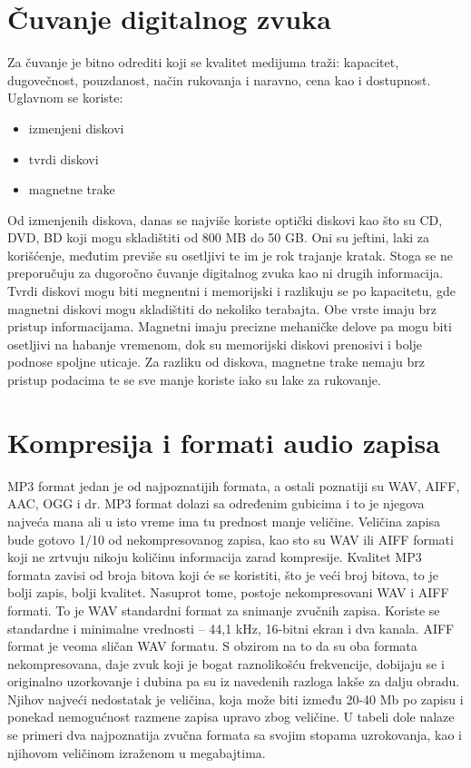 \documentclass[a4paper]{article}
\begin{document}
    \section{Čuvanje digitalnog zvuka}
    Za čuvanje je bitno odrediti koji se kvalitet medijuma traži: kapacitet, dugovečnost, pouzdanost, način rukovanja i naravno, cena kao i dostupnost. Uglavnom se koriste:
    \begin{itemize}
        \item izmenjeni diskovi
        \item tvrdi diskovi
        \item magnetne trake
    \end{itemize}
Od izmenjenih diskova, danas se najviše koriste optički diskovi kao što su CD, DVD, BD koji mogu skladištiti od 800 MB do 50 GB. Oni su jeftini, laki za korišćenje, međutim previše su osetljivi te im je rok trajanje kratak. Stoga se ne preporučuju za dugoročno čuvanje digitalnog zvuka kao ni drugih informacija. 
Tvrdi diskovi mogu biti megnentni i memorijski i razlikuju se po kapacitetu, gde magnetni diskovi mogu skladištiti do nekoliko terabajta. Obe vrste imaju brz pristup informacijama. Magnetni imaju precizne mehaničke delove pa mogu biti osetljivi na habanje vremenom, dok su memorijski diskovi prenosivi i bolje podnose spoljne uticaje. 
Za razliku od diskova, magnetne trake nemaju brz pristup podacima te se sve manje koriste iako su lake za rukovanje.\cite{jurkovic2021digitalizacija} 

        \section{Kompresija i formati audio zapisa}
    MP3 format jedan je od najpoznatijih formata, a ostali poznatiji su WAV, AIFF, AAC,
    OGG i dr. MP3 format dolazi sa određenim gubicima i to je njegova najveća mana ali u isto vreme ima tu prednost manje veličine. Veličina zapisa bude gotovo 1/10 od nekompresovanog zapisa, kao sto su WAV ili AIFF formati koji ne zrtvuju nikoju količinu informacija zarad kompresije. Kvalitet
    MP3 formata zavisi od broja bitova koji će se koristiti, što je veći broj bitova, to je bolji zapis,
    bolji kvalitet. Nasuprot tome, postoje nekompresovani WAV i AIFF formati. To je WAV
    standardni format za snimanje zvučnih zapisa. Koriste se standardne i minimalne
    vrednosti – 44,1 kHz, 16-bitni ekran i dva kanala. AIFF format je veoma sličan WAV formatu.
    S obzirom na to da su oba formata nekompresovana, daje zvuk koji je bogat raznolikošću
    frekvencije, dobijaju se i originalno uzorkovanje i dubina pa su iz navedenih razloga
    lakše za dalju obradu. Njihov najveći nedostatak je veličina, koja može biti između 20-40 Mb po
    zapisu i ponekad nemogućnost razmene zapisa upravo zbog veličine. U tabeli dole nalaze se primeri dva najpoznatija zvučna formata sa svojim stopama uzrokovanja, kao i njihovom veličinom izraženom u megabajtima.
    
\end{document}
